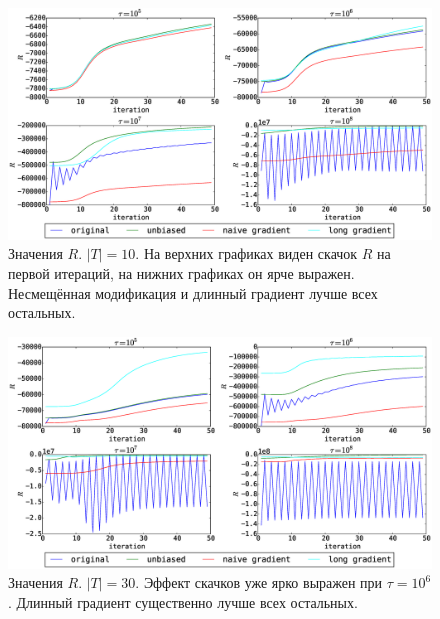 \documentclass[utf8]{beamer}
\begin{document}
\begin{frame}
\begin{figure}[h]
	\centering   
	\caption{Значения $R$. $|T| = 10$.  На верхних графиках виден скачок $R$ на первой итераций, на нижних графиках он ярче выражен. Несмещённая модификация и длинный  градиент лучше всех остальных.} 
	\medskip
	\includegraphics[width=0.9\linewidth]{presentation_pictures/topics_10_R_values.eps}  
\end{figure}
\end{frame}
	
\begin{frame}
\begin{figure}[h]
	\centering   
	\caption{Значения $R$. $|T| = 30$. Эффект скачков уже ярко выражен при $\tau = 10^6$. Длинный градиент существенно лучше всех остальных.} 
	\medskip
	\includegraphics[width=0.9\linewidth]{presentation_pictures/topics_30_R_values.eps}  
\end{figure}
\end{frame}
	
\end{document}
